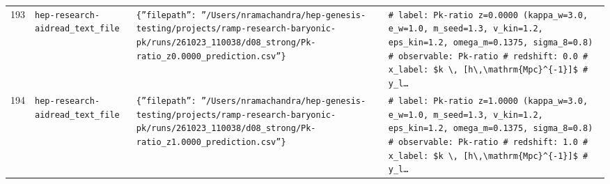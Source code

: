 \documentclass[11pt,a4paper]{article}
\begin{document}
\begin{longtable}{@{}p{}p{}p{}p{}@{}}
193 & \texttt{hep-research-aid}\newline\texttt{read\_\allowbreak{}text\_\allowbreak{}file} & \texttt{\{''filepath'':\allowbreak{} ''/\allowbreak{}Users/\allowbreak{}nramachandra/\allowbreak{}hep-genesis-testing/\allowbreak{}projects/\allowbreak{}ramp-research-baryonic-pk/\allowbreak{}runs/\allowbreak{}261023\_\allowbreak{}110038/\allowbreak{}d08\_\allowbreak{}strong/\allowbreak{}Pk-ratio\_\allowbreak{}z0.0000\_\allowbreak{}prediction.csv''\}\allowbreak{}} & \texttt{\# label:\allowbreak{} Pk-ratio z=\allowbreak{}0.0000 (kappa\_\allowbreak{}w=\allowbreak{}3.0,\allowbreak{} e\_\allowbreak{}w=\allowbreak{}1.0,\allowbreak{} m\_\allowbreak{}seed=\allowbreak{}1.3,\allowbreak{} v\_\allowbreak{}kin=\allowbreak{}1.2,\allowbreak{} eps\_\allowbreak{}kin=\allowbreak{}1.2,\allowbreak{} omega\_\allowbreak{}m=\allowbreak{}0.1375,\allowbreak{} sigma\_\allowbreak{}8=\allowbreak{}0.8)\allowbreak{} \# observable:\allowbreak{} Pk-ratio \# redshift:\allowbreak{} 0.0 \# x\_\allowbreak{}label:\allowbreak{} \$k \textbackslash{}\allowbreak{},\allowbreak{} [h\textbackslash{}\allowbreak{},\allowbreak{}\textbackslash{}\allowbreak{}mathrm\{Mpc\}\allowbreak{}\textasciicircum{}\allowbreak{}\{-1\}\allowbreak{}]\allowbreak{}\$ \# y\_\allowbreak{}l\ldots{}\allowbreak{}} \\
194 & \texttt{hep-research-aid}\newline\texttt{read\_\allowbreak{}text\_\allowbreak{}file} & \texttt{\{''filepath'':\allowbreak{} ''/\allowbreak{}Users/\allowbreak{}nramachandra/\allowbreak{}hep-genesis-testing/\allowbreak{}projects/\allowbreak{}ramp-research-baryonic-pk/\allowbreak{}runs/\allowbreak{}261023\_\allowbreak{}110038/\allowbreak{}d08\_\allowbreak{}strong/\allowbreak{}Pk-ratio\_\allowbreak{}z1.0000\_\allowbreak{}prediction.csv''\}\allowbreak{}} & \texttt{\# label:\allowbreak{} Pk-ratio z=\allowbreak{}1.0000 (kappa\_\allowbreak{}w=\allowbreak{}3.0,\allowbreak{} e\_\allowbreak{}w=\allowbreak{}1.0,\allowbreak{} m\_\allowbreak{}seed=\allowbreak{}1.3,\allowbreak{} v\_\allowbreak{}kin=\allowbreak{}1.2,\allowbreak{} eps\_\allowbreak{}kin=\allowbreak{}1.2,\allowbreak{} omega\_\allowbreak{}m=\allowbreak{}0.1375,\allowbreak{} sigma\_\allowbreak{}8=\allowbreak{}0.8)\allowbreak{} \# observable:\allowbreak{} Pk-ratio \# redshift:\allowbreak{} 1.0 \# x\_\allowbreak{}label:\allowbreak{} \$k \textbackslash{}\allowbreak{},\allowbreak{} [h\textbackslash{}\allowbreak{},\allowbreak{}\textbackslash{}\allowbreak{}mathrm\{Mpc\}\allowbreak{}\textasciicircum{}\allowbreak{}\{-1\}\allowbreak{}]\allowbreak{}\$ \# y\_\allowbreak{}l\ldots{}\allowbreak{}} \\

\end{longtable}
\end{document}

